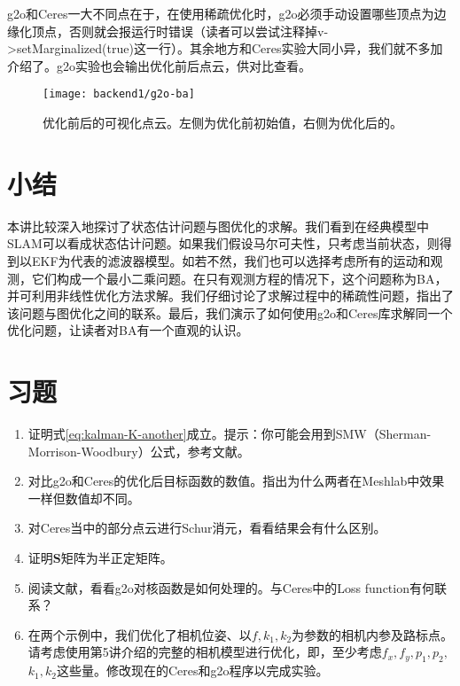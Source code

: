 g2o和Ceres一大不同点在于，在使用稀疏优化时，g2o必须手动设置哪些顶点为边缘化顶点，否则就会报运行时错误（读者可以尝试注释掉v->setMarginalized(true)这一行）。其余地方和Ceres实验大同小异，我们就不多加介绍了。g2o实验也会输出优化前后点云，供对比查看。

\begin{figure}[!htp]
	\centering
	\texttt{[image: backend1/g2o-ba]}
	\caption{优化前后的可视化点云。左侧为优化前初始值，右侧为优化后的。}
	\label{fig:g2o-BA}
\end{figure}

\section{小结}
本讲比较深入地探讨了状态估计问题与图优化的求解。我们看到在经典模型中SLAM可以看成状态估计问题。如果我们假设马尔可夫性，只考虑当前状态，则得到以EKF为代表的滤波器模型。如若不然，我们也可以选择考虑所有的运动和观测，它们构成一个最小二乘问题。在只有观测方程的情况下，这个问题称为BA，并可利用非线性优化方法求解。我们仔细讨论了求解过程中的稀疏性问题，指出了该问题与图优化之间的联系。最后，我们演示了如何使用g2o和Ceres库求解同一个优化问题，让读者对BA有一个直观的认识。

\section*{习题}
\begin{enumerate}
	\item 证明式\eqref{eq:kalman-K-another}成立。提示：你可能会用到SMW（Sherman-Morrison-Woodbury）公式，参考文献\cite{Sherman1950, Barfoot2016}。
	\item 
	对比g2o和Ceres的优化后目标函数的数值。指出为什么两者在Meshlab中效果一样但数值却不同。
	\item 
	对Ceres当中的部分点云进行Schur消元，看看结果会有什么区别。
	\item 证明$\bm{S}$矩阵为半正定矩阵。
	\item 阅读文献\cite{Kummerle2011}，看看g2o对核函数是如何处理的。与Ceres中的Loss function有何联系？
	\item[\optional] 在两个示例中，我们优化了相机位姿、以$f, k_1, k_2$为参数的相机内参及路标点。请考虑使用第5讲介绍的完整的相机模型进行优化，即，至少考虑$f_x, f_y, p_1, p_2,$ $k_1, k_2$这些量。修改现在的Ceres和g2o程序以完成实验。
\end{enumerate}
